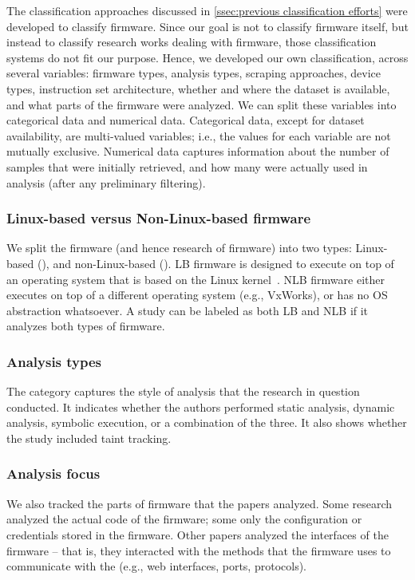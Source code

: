 The classification approaches discussed in \autoref{ssec:previous classification efforts} were developed to classify firmware.
Since our goal is not to classify firmware itself, but instead to classify research works dealing with firmware, those classification systems do not fit our purpose.
Hence, we developed our own classification, across several variables: firmware types, analysis types, scraping approaches, device types, instruction set architecture, whether and where the dataset is available, and what parts of the firmware were analyzed.
We can split these variables into categorical data and numerical data.
Categorical data, except for dataset availability, are multi-valued variables; i.e., the values for each variable are not mutually exclusive.
Numerical data captures information about the number of samples that were initially retrieved, and how many were actually used in analysis (after any preliminary filtering).

\subsubsection{Linux-based versus Non-Linux-based firmware}
We split the firmware (and hence research of firmware) into two types: Linux-based (), and non-Linux-based ().
LB firmware is designed to execute on top of an operating system that is based on the Linux kernel~\cite{linuxkernel}.
NLB firmware either executes on top of a different operating system (e.g., VxWorks), or has no OS abstraction whatsoever.
A study can be labeled as both LB and NLB if it analyzes both types of firmware.

\subsubsection{Analysis types}
The  category captures the style of analysis that the research in question conducted.
It indicates whether the authors performed static analysis, dynamic analysis, symbolic execution, or a combination of the three.
It also shows whether the study included taint tracking.

\subsubsection{Analysis focus}
We also tracked the parts of firmware that the papers analyzed.
Some research analyzed the actual code of the firmware; some only the configuration or credentials stored in the firmware.
Other papers analyzed the interfaces of the firmware -- that is, they interacted with the methods that the firmware uses to communicate with the  (e.g., web interfaces, ports, protocols).

